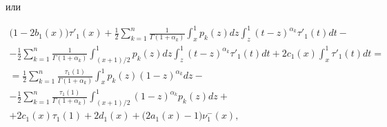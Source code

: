 или

 \begin{multline}

\bigl( {1 - 2{b_1}(x)} \bigr){\tau '_1}(x) + \frac{1}{2}\sum\limits_{k = 1}^n {\frac{1}{{\Gamma (1 +

{\alpha _k})}}}  \int _x^1 {{p_k}(z)dz}  \int _z^1 {{{(t - z)}^{{\alpha _k}}}} {\tau '_1}(t)dt -

\\

 - \frac{1}{2}\sum\limits_{k = 1}^n {\frac{1}{{\Gamma (1 + {\alpha _k})}} \int _{({{x + 1}})/{2}}^1 {{p_k}(z)dz \int _z^1 {{{(t - z)}^{{\alpha

 _k}}}} {\tau '_1}(t)} dt} 

  + 2{c_1}(x) \int _x^1 {{\tau '_1}(t)dt}= \\ =

\frac{1}{2}\sum\limits_{k = 1}^n {\frac{{{\tau _1}(1)}}{{\Gamma (1 + {\alpha _k})}} \int _x^1 {{p_k}(z){{(1 -

 z)}^{{\alpha _k}}}dz} }- \hspace{3cm}

\\- 

  \frac{1}{2}\sum\limits_{k = 1}^n {\frac{{{\tau _1}(1)}}{{\Gamma (1 + {\alpha _k})}} \int _{({{x + 1}})/{2}}^1 {{{(1 - z)}^{{\alpha

 _k}}}{p_k}(z)dz} } + 

 \\

  + 2{c_1}(x){\tau _1}(1) + 2{d_1}(x) + \bigl( {2{a_1}(x) - 1} \bigr)\nu _1^ - (x),\label{eq:21.1}

\end{multline}

